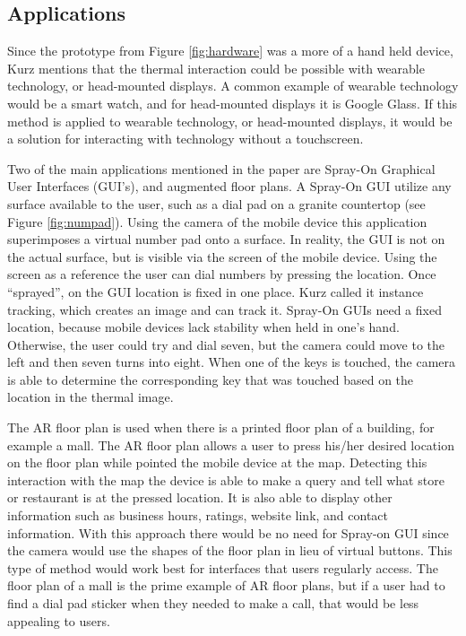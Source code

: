 \documentclass{sig-alternate}
\begin{document}
\subsection{Applications}
\label{Thermal Applications}
Since the prototype from Figure \ref{fig:hardware} was a more of a hand held device, Kurz mentions that the thermal interaction could be possible with wearable technology, or head-mounted displays. A common example of wearable technology would be a smart watch, and for head-mounted displays it is Google Glass. If this method is applied to wearable technology, or head-mounted displays, it would be a solution for interacting with technology without a touchscreen.     

Two of the main applications mentioned in the paper are Spray-On Graphical User Interfaces (GUI's), and augmented floor plans. A Spray-On GUI utilize any surface available to the user, such as a dial pad on a granite countertop (see Figure \ref{fig:numpad}). Using the camera of the mobile device this application superimposes a virtual number pad onto a surface. In reality, the GUI is not on the actual surface, but is visible via the screen of the mobile device. Using the screen as a reference the user can dial numbers by pressing the location. Once ``sprayed'', on the GUI location is fixed in one place. Kurz called it instance tracking, which creates an image and can track it. Spray-On GUIs need a fixed location, because mobile devices lack stability when held in one's hand. Otherwise, the user could try and dial seven, but the camera could move to the left and then seven turns into eight. When one of the keys is touched, the camera is able to determine the corresponding key that was touched based on the location in the thermal image. 

The AR floor plan is used when there is a printed floor plan of a building, for example a mall. The AR floor plan allows a user to press his/her desired location on the floor plan while pointed the mobile device at the map. Detecting this interaction with the map the device is able to make a query and tell what store or restaurant is at the pressed location. It is also able to display other information such as business hours, ratings, website link, and contact information. With this approach there would be no need for Spray-on GUI since the camera would use the shapes of the floor plan in lieu of virtual buttons. This type of method would work best for interfaces that users regularly access. The floor plan of a mall is the prime example of AR floor plans, but if a user had to find a dial pad sticker when they needed to make a call, that would be less appealing to users.      
\end{document}
